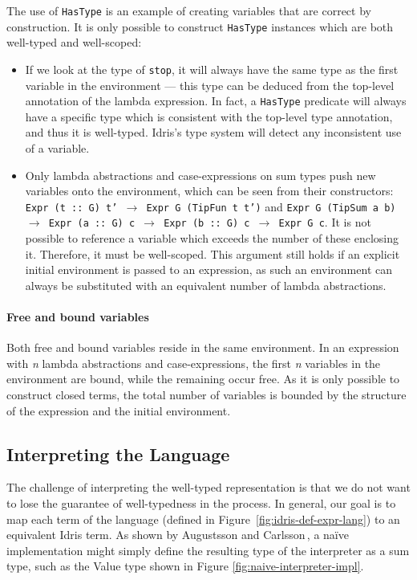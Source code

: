 The use of \texttt{HasType} is an example of creating variables that are correct by construction. It is only possible to construct \texttt{HasType} instances which are both well-typed and well-scoped:
\begin{itemize}
\item If we look at the type of \texttt{stop}, it will always have the same type as the first variable in the environment --- this type can be deduced from the top-level annotation of the lambda expression. In fact, a \texttt{HasType} predicate will always have a specific type which is consistent with the top-level type annotation, and thus it is well-typed. Idris's type system will detect any inconsistent use of a variable. 
\item Only lambda abstractions and case-expressions on sum types push new variables onto the environment, which can be seen from their constructors: \texttt{Expr (t :: G) t' \(\rightarrow\) Expr G (TipFun t t')} and \texttt{Expr G (TipSum a b) \(\rightarrow\) Expr (a :: G) c \(\rightarrow\) Expr (b :: G) c \(\rightarrow\) Expr G c}. It is not possible to reference a variable which exceeds the number of these enclosing it. Therefore, it must be well-scoped. This argument still holds if an explicit initial environment is passed to an expression, as such an environment can always be substituted with an equivalent number of lambda abstractions.
\end{itemize}

\paragraph{Free and bound variables} Both free and bound variables reside in the same environment. In an expression with \textit{n} lambda abstractions and case-expressions, the first \textit{n} variables in the environment are bound, while the remaining occur free. As it is only possible to construct closed terms, the total number of variables is bounded by the structure of the expression and the initial environment.

\subsection{Interpreting the Language}
The challenge of interpreting the well-typed representation is that we do not want to lose the guarantee of well-typedness in the process. In general, our goal is to map each term of the language (defined in Figure~\ref{fig:idris-def-expr-lang}) to an equivalent Idris term. As shown by Augustsson and Carlsson\,\cite{Augustsson99anexercise}, a na\"{i}ve implementation might simply define the resulting type of the interpreter as a sum type, such as the Value type shown in Figure \ref{fig:naive-interpreter-impl}.

